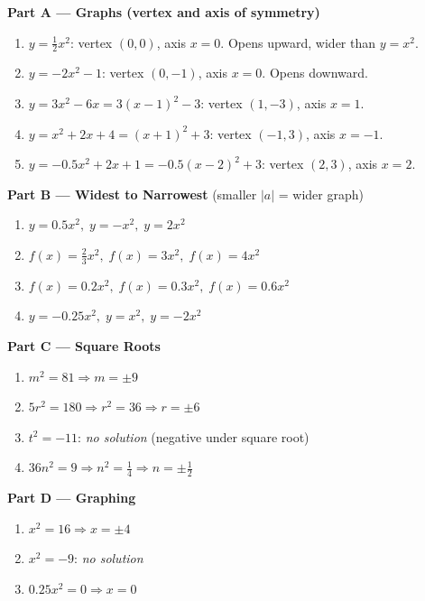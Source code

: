 \documentclass[12pt]{article}
\begin{document}
\begin{tcolorbox}[ansbox]

\textbf{Part A — Graphs (vertex and axis of symmetry)}

\begin{enumerate}[leftmargin=*, label=\textbf{\arabic*.}]
  \item $y = \frac{1}{2}x^2$: vertex $(0,0)$, axis $x = 0$. Opens upward, wider than $y=x^2$.
  \item $y = -2x^2 - 1$: vertex $(0,-1)$, axis $x = 0$. Opens downward.
  \item $y = 3x^2 - 6x = 3(x-1)^2 - 3$: vertex $(1,-3)$, axis $x = 1$.
  \item $y = x^2 + 2x + 4 = (x+1)^2 + 3$: vertex $(-1,3)$, axis $x = -1$.
  \item $y = -0.5x^2 + 2x + 1 = -0.5(x-2)^2 + 3$: vertex $(2,3)$, axis $x = 2$.
\end{enumerate}

\medskip
\textbf{Part B — Widest to Narrowest} (smaller $|a|$ = wider graph)

\begin{enumerate}[leftmargin=*, label=\textbf{\arabic*.}, start=6]
  \item $y=0.5x^2,\; y=-x^2,\; y=2x^2$
  \item $f(x)=\frac{2}{3}x^2,\; f(x)=3x^2,\; f(x)=4x^2$
  \item $f(x)=0.2x^2,\; f(x)=0.3x^2,\; f(x)=0.6x^2$
  \item $y=-0.25x^2,\; y=x^2,\; y=-2x^2$
\end{enumerate}

\medskip
\textbf{Part C — Square Roots}

\begin{enumerate}[leftmargin=*, label=\textbf{\arabic*.}, start=10]
  \item $m^2 = 81 \Rightarrow m = \pm 9$
  \item $5r^2 = 180 \Rightarrow r^2 = 36 \Rightarrow r = \pm 6$
  \item $t^2 = -11$: \textit{no solution} (negative under square root)
  \item $36n^2 = 9 \Rightarrow n^2 = \frac{1}{4} \Rightarrow n = \pm\frac{1}{2}$
\end{enumerate}

\medskip
\textbf{Part D — Graphing}

\begin{enumerate}[leftmargin=*, label=\textbf{\arabic*.}, start=14]
  \item $x^2 = 16 \Rightarrow x = \pm 4$
  \item $x^2 = -9$: \textit{no solution}
  \item $0.25x^2 = 0 \Rightarrow x = 0$
\end{enumerate}


\end{tcolorbox}
\end{document}

